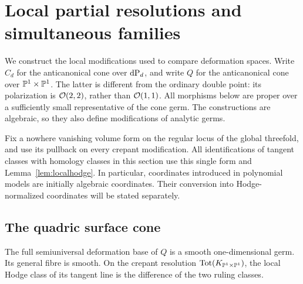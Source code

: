 \section{Local partial resolutions and simultaneous families}\label{sec03:partial}

We construct the local modifications used to compare deformation spaces.
Write $C_d$ for the anticanonical cone over $\mathrm{dP}_d$, and write $Q$ for the
anticanonical cone over $\mathbb{P}^1\times\mathbb{P}^1$.  The latter is different from
the ordinary double point: its polarization is $\mathcal{O}(2,2)$, rather than
$\mathcal{O}(1,1)$.  All morphisms below are proper over a sufficiently small
representative of the cone germ.  The constructions are algebraic, so
they also define modifications of analytic germs.

Fix a nowhere vanishing volume form on the regular locus of the global
threefold, and use its pullback on every crepant modification.  All
identifications of tangent classes with homology classes in this section
use this single form and Lemma~\ref{lem:localhodge}.  In particular,
coordinates introduced in polynomial models are initially algebraic
coordinates.  Their conversion into Hodge-normalized coordinates will
be stated separately.



\subsection{The quadric surface cone}

\begin{lemma}\label{lem03:quadric}
The full semiuniversal deformation base of $Q$ is a smooth
one-dimensional germ.  Its general fibre is smooth.  On the crepant
resolution $\operatorname{Tot}(K_{\mathbb{P}^1\times\mathbb{P}^1})$, the local Hodge
class of its tangent line is the difference of the two ruling classes.
\end{lemma}

